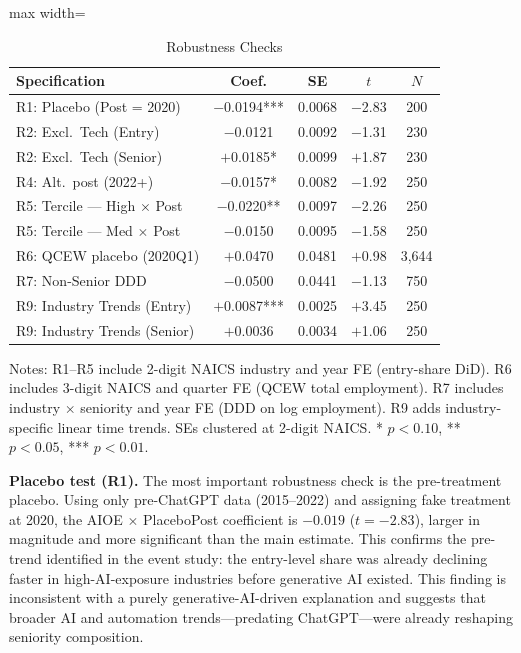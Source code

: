 \documentclass[12pt]{article}
\begin{document}
\begin{table}[H]
\centering
\caption{Robustness Checks}
\label{tab:robustness}
\begin{threeparttable}
\begin{adjustbox}{max width=\textwidth}
\begin{tabular}{lcccc}
\toprule
Specification & Coef. & SE & $t$ & $N$ \\
\midrule
R1: Placebo (Post = 2020) & $-$0.0194*** & 0.0068 & $-$2.83 & 200 \\
R2: Excl.\ Tech (Entry) & $-$0.0121 & 0.0092 & $-$1.31 & 230 \\
R2: Excl.\ Tech (Senior) & $+$0.0185* & 0.0099 & $+$1.87 & 230 \\
R4: Alt.\ post (2022+) & $-$0.0157* & 0.0082 & $-$1.92 & 250 \\
R5: Tercile --- High $\times$ Post & $-$0.0220** & 0.0097 & $-$2.26 & 250 \\
R5: Tercile --- Med $\times$ Post & $-$0.0150 & 0.0095 & $-$1.58 & 250 \\
R6: QCEW placebo (2020Q1) & $+$0.0470 & 0.0481 & $+$0.98 & 3,644 \\
R7: Non-Senior DDD & $-$0.0500 & 0.0441 & $-$1.13 & 750 \\
R9: Industry Trends (Entry) & $+$0.0087*** & 0.0025 & $+$3.45 & 250 \\
R9: Industry Trends (Senior) & $+$0.0036 & 0.0034 & $+$1.06 & 250 \\
\bottomrule
\end{tabular}
\end{adjustbox}
\begin{tablenotes}[flushleft]
\small
\item Notes: R1--R5 include 2-digit NAICS industry and year FE (entry-share DiD). R6 includes 3-digit NAICS and quarter FE (QCEW total employment). R7 includes industry $\times$ seniority and year FE (DDD on log employment). R9 adds industry-specific linear time trends. SEs clustered at 2-digit NAICS. * $p<0.10$, ** $p<0.05$, *** $p<0.01$.
\end{tablenotes}
\end{threeparttable}
\end{table}

\textbf{Placebo test (R1).} The most important robustness check is the pre-treatment placebo. Using only pre-ChatGPT data (2015--2022) and assigning fake treatment at 2020, the AIOE $\times$ PlaceboPost coefficient is $-0.019$ ($t = -2.83$), larger in magnitude and more significant than the main estimate. This confirms the pre-trend identified in the event study: the entry-level share was already declining faster in high-AI-exposure industries before generative AI existed. This finding is inconsistent with a purely generative-AI-driven explanation and suggests that broader AI and automation trends---predating ChatGPT---were already reshaping seniority composition.
\end{document}
